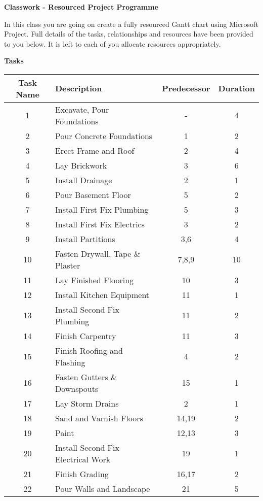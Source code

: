 

	
\begin{flushleft}
\Large\textbf{Classwork - Resourced Project Programme}\\
\end{flushleft}

In this class you are going on create a fully resourced Gantt chart using Microsoft Project.  Full details of the tasks, relationships and resources have been provided to you below.  It is left to each of you  allocate resources appropriately. 


\vspace{.5cm}
\large\textbf{Tasks}\\
\vspace{.25cm}

\begin{tabular}{|c|l|c|c|}
	\hline 
	\textbf{Task Name} & \textbf{Description} & \textbf{Predecessor} & \textbf{Duration} \\ 
	\hline 
	
	1	& Excavate, Pour Foundations &	-	&4\\\hline 
	2	& Pour Concrete Foundations		&1	&2\\\hline 
	3	& Erect Frame and Roof			&2	&4\\\hline 
	4	& Lay Brickwork					&3	&6\\\hline 
	5	& Install Drainage				&2	&1\\\hline 
	6	& Pour Basement Floor			&5	&2\\\hline 
	7	& Install First Fix Plumbing		&5	&3\\\hline 
	8	& Install First Fix Electrics	&3	&2\\\hline 
	9	& Install Partitions				&3,6	&4\\\hline
	10	& Fasten Drywall, Tape \& Plaster	&7,8,9	&10\\\hline 
	11	& Lay Finished Flooring			&10	&3\\\hline 
	12	& Install Kitchen Equipment		&11	&1\\\hline 
	13	& Install Second Fix Plumbing	&11	&2\\\hline 
	14	& Finish Carpentry				&11	&3\\\hline
	15	& Finish Roofing and Flashing	&4	&2\\\hline 
	16	& Fasten Gutters \& Downspouts	&15	&1\\\hline 
	17	& Lay Storm Drains				&2	&1\\\hline 
	18	& Sand and Varnish Floors		&14,19	&2\\\hline 
	19	& Paint							&12,13	&3\\\hline 
	20	& Install Second Fix Electrical Work	&19	&1\\\hline 
	21	& Finish Grading					&16,17	&2 \\\hline
	22	& Pour Walls and Landscape		&21	&5 \\
	\hline 
	 
\end{tabular} 


